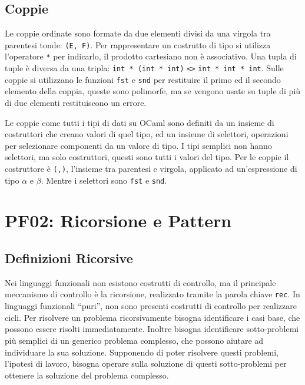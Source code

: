 \documentclass{article}
\numberwithin{equation}{subsection}
\begin{document}
\subsection{Coppie}

Le coppie ordinate sono formate da due elementi divisi da una virgola tra parentesi tonde: \verb|(E, F)|. Per rappresentare un costrutto di tipo si utilizza l'operatore \verb|*| per indicarlo, il prodotto cartesiano non è associativo. Una tupla di tuple è diversa da una tripla: \verb|int * (int * int)| \verb|<>| \verb|int * int * int|. 
Sulle coppie si utilizzano le funzioni \verb|fst| e \verb|snd| per restituire il primo ed il secondo elemento della coppia, queste sono polimorfe, ma se vengono usate su tuple di più di due elementi restituiscono un errore. 

Le coppie come tutti i tipi di dati su OCaml sono definiti da un insieme di costruttori che creano valori di quel tipo, ed un insieme di selettori, operazioni per selezionare componenti da un valore di tipo. 
I tipi semplici non hanno selettori, ma solo costruttori, questi sono tutti i valori del tipo. 
Per le coppie il costruttore è \verb|(,)|, l'insieme tra parentesi e virgola, applicato ad un'espressione di tipo $\alpha$ e $\beta$. Mentre i selettori sono \verb|fst| e \verb|snd|. 



\clearpage


\section{PF02: Ricorsione e Pattern}

\subsection{Definizioni Ricorsive}

Nei linguaggi funzionali non esistono costrutti di controllo, ma il principale meccanismo di controllo è la ricorsione, realizzato tramite la parola chiave \verb|rec|. 
In linguaggi funzionali ``puri'', non sono presenti costrutti di controllo per realizzare cicli. Per risolvere un problema ricorsivamente bisogna identificare i casi base, che possono essere risolti immediatamente. Inoltre bisogna identificare sotto-problemi più semplici di un generico problema complesso, che possono aiutare ad individuare la sua soluzione. Supponendo di poter risolvere questi problemi, l'ipotesi di lavoro, bisogna operare sulla soluzione di questi sotto-problemi per ottenere la soluzione del problema complesso. 
\end{document}
